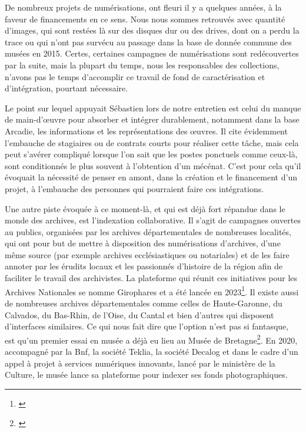 \noindent
\hspace*{1cm}
\begin{minipage}{\dimexpr\linewidth-2cm}
\fontsize{10}{12}\selectfont
De nombreux projets de numérisations, ont fleuri il y a quelques années, à la faveur de financements en ce sens. Nous nous sommes retrouvés avec quantité d'images, qui sont restées là sur des disques dur ou des drives, dont on a perdu la trace ou qui n'ont pas survécu au passage dans la base de donnée commune des musées en 2015. Certes, certaines campagnes de numérisations sont redécouvertes par la suite, mais la plupart du temps, nous les responsables des collections, n'avons pas le temps d'accomplir ce travail de fond de caractérisation et d'intégration, pourtant nécessaire. \footnotemark{}
\end{minipage}

\vspace{1em}


Le point sur lequel appuyait Sébastien lors de notre entretien est celui du manque de main-d’œuvre pour absorber et intégrer durablement, notamment dans la base Arcadie, les informations et les représentations des œuvres. Il cite évidemment l'embauche de stagiaires ou de contrats courts pour réaliser cette tâche, mais cela peut s'avérer compliqué lorsque l'on sait que les postes ponctuels comme ceux-là, sont conditionnés le plus souvent à l'obtention d'un mécénat. C'est pour cela qu'il évoquait la nécessité de penser en amont, dans la création et le financement d'un projet, à l'embauche des personnes qui pourraient faire ces intégrations. 

Une autre piste évoquée à ce moment-là, et qui est déjà fort répandue dans le monde des archives, est l'indexation collaborative. Il s'agit de campagnes ouvertes au publics, organisées par les archives départementales de nombreuses localités, qui ont pour but de mettre à disposition des numérisations d'archives, d'une même source (par exemple archives ecclésiastiques ou notariales) et de les faire annoter par les érudits locaux et les passionnés d'histoire de la région afin de faciliter le travail des archivistes. La plateforme qui réunit ces initiatives pour les Archives Nationales se nomme Girophares et a été lancée en 2023\footnote{\cite{noauthor_archives_nodate}}. Il existe aussi de nombreuses archives départementales comme celles de Haute-Garonne, du Calvados, du Bas-Rhin, de l'Oise, du Cantal et bien d'autres qui disposent d'interfaces similaires. Ce qui nous fait dire que l'option n'est pas si fantasque, est qu'un premier essai en musée a déjà eu lieu au Musée de Bretagne\footnote{\cite{noauthor_lindexation_nodate}}. En 2020, accompagné par la Bnf, la société Teklia, la société Decalog et dans le cadre d’un appel à projet à services numériques innovants, lancé par le ministère de la Culture, le musée lance sa plateforme pour indexer ses fonds photographiques.


